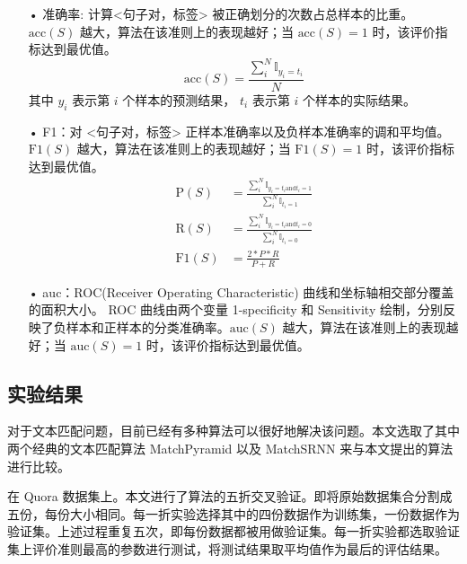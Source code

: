\begin{itemize}
  \item[•] 准确率: 计算<句子对，标签> 被正确划分的次数占总样本的比重。 $\text{acc}(S)$ 越大，算法在该准则上的表现越好；当 $\text{acc}(S) = 1$ 时，该评价指标达到最优值。
  $$
  \text{acc}(S) = \frac{\sum_i^N\mathbb{I}_{y_i=t_i}}{N}
  $$
  其中 $y_i$ 表示第 $i$ 个样本的预测结果， $t_i$ 表示第 $i$ 个样本的实际结果。
  \item[•] F1：对 <句子对，标签> 正样本准确率以及负样本准确率的调和平均值。 $\text{F1}(S)$ 越大，算法在该准则上的表现越好；当 $\text{F1}(S) = 1$ 时，该评价指标达到最优值。
  $$
  \begin{aligned}
  \text{P}(S) &= \frac{\sum_i^N\mathbb{I}_{y_i=t_i \text{and} t_i = 1}}{\sum_i^N\mathbb{I}_{t_i = 1}}\\
  \text{R}(S) &= \frac{\sum_i^N\mathbb{I}_{y_i=t_i \text{and} t_i = 0}}{\sum_i^N\mathbb{I}_{t_i = 0}}\\
  \text{F1}(S) &= \frac{2*P*R}{P+R}
  \end{aligned}
  $$
  \item[•] auc：ROC(Receiver Operating Characteristic) 曲线和坐标轴相交部分覆盖的面积大小。 ROC 曲线由两个变量 1-specificity 和 Sensitivity 绘制，分别反映了负样本和正样本的分类准确率。$\text{auc}(S)$ 越大，算法在该准则上的表现越好；当 $\text{auc}(S) = 1$ 时，该评价指标达到最优值。
\end{itemize}

\subsection{实验结果}
\label{sec:lab_value}
对于文本匹配问题，目前已经有多种算法可以很好地解决该问题。本文选取了其中两个经典的文本匹配算法 MatchPyramid\cite{Pang2016TextMA} 以及 MatchSRNN\cite{Wan2016MatchSRNNMT} 来与本文提出的算法进行比较。

在 Quora 数据集上。本文进行了算法的五折交叉验证。即将原始数据集合分割成五份，每份大小相同。每一折实验选择其中的四份数据作为训练集，一份数据作为验证集。上述过程重复五次，即每份数据都被用做验证集。每一折实验都选取验证集上评价准则最高的参数进行测试，将测试结果取平均值作为最后的评估结果。

